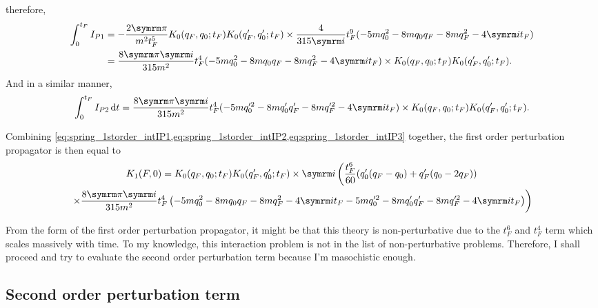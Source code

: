 therefore,
\begin{align}
    \int_{0}^{t_F} I_{P1} &= -\frac{2\cpi}{m^2t_F^5} K_0(q_F, q_0; t_F)K_0(q_F', q_0'; t_F) \times \frac{4}{315\im}t_F^9(-5mq_0^2 - 8mq_0q_F - 8mq_F^2 - 4\im t_F) \\
    &= \frac{8\cpi\im}{315m^2}t_F^4(-5mq_0^2 - 8mq_0q_F - 8mq_F^2 - 4\im t_F) \times K_0(q_F, q_0; t_F)K_0(q_F', q_0'; t_F).\label{eq:spring_1storder_intIP1}
\end{align}
And in a similar manner,
\begin{equation}
    \int_{0}^{t_F}I_{P2}\dd{t} = \frac{8\cpi\im}{315m^2}t_F^4(-5mq_0'^2 - 8mq_0'q_F' - 8mq_F'^2 - 4\im t_F) \times K_0(q_F, q_0; t_F)K_0(q_F', q_0'; t_F).\label{eq:spring_1storder_intIP2}
\end{equation}

Combining \cref{eq:spring_1storder_intIP1,eq:spring_1storder_intIP2,eq:spring_1storder_intIP3} together, the first order perturbation propagator is then equal to
\begin{multline}
    K_1(F, 0) = K_0(q_F, q_0; t_F)K_0(q_F', q_0'; t_F) \times \im \left(\frac{t_F^6}{60}(q_0'(q_F - q_0) + q_F'(q_0 - 2q_F)) \right.\\ \left. \times \frac{8\cpi\im}{315m^2}t_F^4\left(-5mq_0^2 - 8mq_0q_F - 8mq_F^2 - 4\im t_F - 5mq_0'^2 - 8mq_0'q_F' - 8mq_F'^2 - 4\im t_F\right) \right)
\end{multline}

From the form of the first order perturbation propagator, it might be that this theory is non-perturbative due to the $t_F^6$ and $t_F^4$ term which scales massively with time. To my knowledge, this interaction problem is not in the list of non-perturbative problems. Therefore, I shall proceed and try to evaluate the second order perturbation term because I'm masochistic enough.

\subsection{Second order perturbation term}

